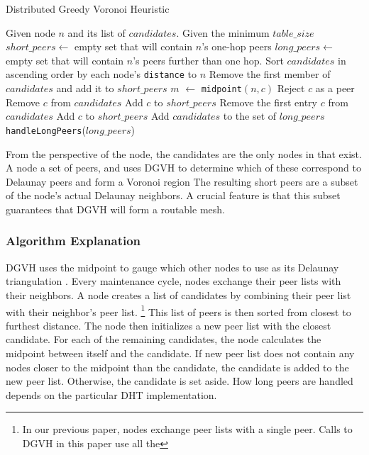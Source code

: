 \documentclass[11pt,conference]{IEEEtran}
\begin{document}
\begin{algorithm} %
	\caption{Distributed Greedy Voronoi Heuristic}
	\label{alg:dgvh}
	\begin{algorithmic}[1]  %
		\STATE Given node $n$ and its list of $candidates$.
		\STATE Given the minimum $table\_size$
		\STATE $short\_peers \leftarrow$ empty set that will contain $n$'s one-hop peers
		\STATE $long\_peers \leftarrow$ empty set that will contain $n$'s peers further than one hop.
		\STATE Sort $candidates$ in ascending order by each node's \texttt{distance} to $n$
		\STATE Remove the first member of $candidates$ and add it to $short\_peers$
			\STATE $m$ $ \leftarrow $ \texttt{midpoint}$( n, c )$
				\STATE Reject $c$ as a peer
			\ELSE
				\STATE Remove $c$ from $candidates$
				\STATE Add $c$ to $short\_peers$
			\ENDIF
		\ENDFOR
			\STATE Remove the first entry $c$ from $candidates$
			\STATE Add $c$ to $short\_peers$
		\ENDWHILE
		\STATE Add $candidates$ to the set of $long\_peers$	
		\STATE \texttt{handleLongPeers}($long\_peers$)
	\end{algorithmic}
\end{algorithm} 


From the perspective of the node, the candidates are the only nodes in that exist.
A node a set of peers, and uses DGVH to determine which of these correspond to Delaunay peers and form a Voronoi region
The resulting short peers are a subset of the node's actual Delaunay neighbors.
A crucial feature is that this subset guarantees that DGVH will form a routable mesh.


\subsubsection*{Algorithm  Explanation}
DGVH uses the midpoint to gauge which other nodes to use as its Delaunay triangulation \cite{dgvh}.
Every maintenance cycle, nodes exchange their peer lists with their neighbors.
A node creates a list of candidates by combining their peer list with their neighbor's peer list. \footnote{In our previous paper, nodes exchange peer lists with a single peer. Calls to DGVH in this paper use all the }
This list of peers is then sorted from closest to furthest distance.
The node then initializes a new peer list with the closest candidate.
For each of the remaining candidates, the node calculates the midpoint between itself and the candidate.
If new peer list does not contain any nodes closer to the midpoint than the candidate, the candidate is added to the new peer list.
Otherwise, the candidate is set aside.
How long peers are handled depends on the particular DHT implementation.
\end{document}
